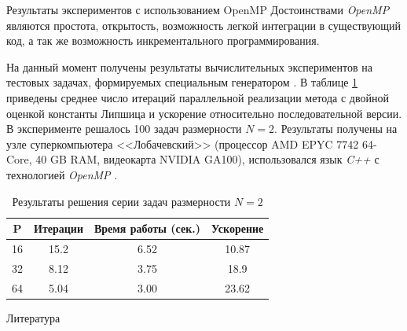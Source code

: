 \documentclass{beamer}
\begin{document}
\begin{frame}[t]
\begin{columns}[t]
\begin{column}[t]{0.47\paperwidth}
\begin{block}{Результаты экспериментов с использованием OpenMP}
Достоинствами \textit{OpenMP} являются простота, открытость, возможность легкой интеграции в существующий код, а так же возможность инкрементального программирования.
 
На данный момент получены результаты вычислительных экспериментов на тестовых задачах, формируемых специальным генератором \cite{GKLS}. В таблице \ref{table:GKLS_RES_1} приведены среднее число итераций параллельной реализации метода с двойной оценкой константы Липшица и ускорение относительно последовательной версии. В эксперименте решалось 100 задач размерности \(N = 2\). Результаты получены на узле суперкомпьютера <<Лобачевский>> (процессор AMD EPYC 7742 64-Core, 40 GB RAM, видеокарта NVIDIA GA100), использовался язык \textit{C++} с технологией \textit{OpenMP} .



\begin{table}[!hbp]
    \centering
    \caption{Результаты решения серии задач размерности $N=2$}
     \renewcommand{\arraystretch}{1.4}
    \renewcommand{\tabcolsep}{1cm}
    \begin{tabular}{|c|c|c|c|}
    \hline
    P  & Итерации  & Время работы (сек.) & Ускорение \\ \hline
        16 & 15.2 & 6.52 & 10.87  \\ \hline
	32 & 8.12 & 3.75 & 18.9  \\ \hline
	64 & 5.04 & 3.00 & 23.62 \\ \hline
	\end{tabular}
    
    \label{table:GKLS_RES_1}
\end{table}

\end{block}
          \begin{block}{Литература}
            \printbibliography

            
          \end{block}
        \end{column}
    \end{columns}
\end{frame}
\end{document}
